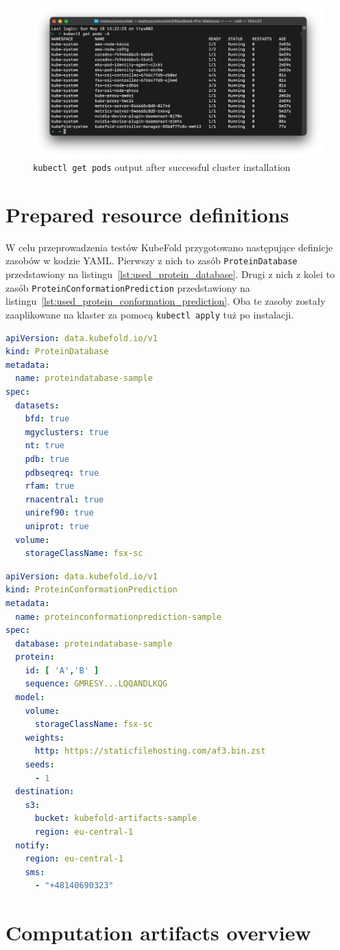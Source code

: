 \begin{figure}[htbp]
  \centering
  \includegraphics[width=\textwidth]{images/eks_pods_terminal}
  \caption{\texttt{kubectl get pods} output after successful cluster installation}
  \label{fig:eks_pods_terminal}
\end{figure}


\section{Prepared resource definitions}

W celu przeprowadzenia testów KubeFold przygotowano następujące definicje zasobów w kodzie YAML.
Pierwszy z nich to zasób \texttt{ProteinDatabase} przedstawiony na listingu~\ref{lst:used_protein_database}.
Drugi z nich z kolei to zasób \texttt{ProteinConformationPrediction} przedstawiony na listingu~\ref{lst:used_protein_conformation_prediction}.
Oba te zasoby zostały zaaplikowane na klaster za pomocą \texttt{kubectl apply} tuż po instalacji.

\begin{lstlisting}[language=yaml,caption={Used \texttt{ProteinDatabase} resource definition},label={lst:used_protein_database}]
apiVersion: data.kubefold.io/v1
kind: ProteinDatabase
metadata:
  name: proteindatabase-sample
spec:
  datasets:
    bfd: true
    mgyclusters: true
    nt: true
    pdb: true
    pdbseqreq: true
    rfam: true
    rnacentral: true
    uniref90: true
    uniprot: true
  volume:
    storageClassName: fsx-sc
\end{lstlisting}

\begin{lstlisting}[language=yaml,caption={Used \texttt{ProteinConformationPrediction} resource definition},label={lst:used_protein_conformation_prediction}]
apiVersion: data.kubefold.io/v1
kind: ProteinConformationPrediction
metadata:
  name: proteinconformationprediction-sample
spec:
  database: proteindatabase-sample
  protein:
    id: [ 'A','B' ]
    sequence: GMRESY...LQQANDLKQG
  model:
    volume:
      storageClassName: fsx-sc
    weights:
      http: https://staticfilehosting.com/af3.bin.zst
    seeds:
      - 1
  destination:
    s3:
      bucket: kubefold-artifacts-sample
      region: eu-central-1
  notify:
    region: eu-central-1
    sms:
      - "+48140690323"
\end{lstlisting}


\section{Computation artifacts overview}